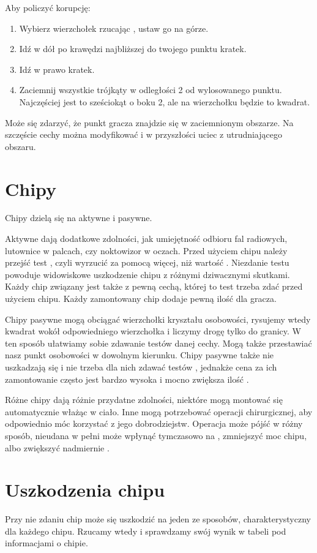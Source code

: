 Aby policzyć korupcję:
\begin{enumerate}
 \item Wybierz wierzchołek rzucając \dvi, ustaw go na górze.
 \item Idź w dół po krawędzi najbliższej do twojego punktu \dxx kratek.
 \item Idź w prawo \dxx[2] kratek.
 \item Zaciemnij wszystkie trójkąty w odległości 2 od wylosowanego punktu. Najczęściej jest to sześciokąt o boku 2, ale na wierzchołku będzie to kwadrat.
\end{enumerate}
Może się zdarzyć, że punkt gracza znajdzie się w zaciemnionym obszarze. 
Na szczęście cechy można modyfikować i w przyszłości uciec z utrudniającego obszaru.

\section{Chipy}
Chipy dzielą się na aktywne i pasywne.

Aktywne dają dodatkowe zdolności, jak umiejętność odbioru fal radiowych, lutownice w palcach, czy noktowizor w oczach.
Przed użyciem chipu należy przejść test \abnkp, czyli wyrzucić za pomocą \dxx więcej, niż wartość \abnkp. 
Niezdanie testu \abnkp powoduje widowiskowe uszkodzenie chipu z różnymi dziwacznymi skutkami.
Każdy chip związany jest także z pewną cechą, której to test trzeba zdać przed użyciem chipu.
Każdy zamontowany chip dodaje pewną ilość \abnkp dla gracza.

Chipy pasywne mogą obciągać wierzchołki kryształu osobowości, rysujemy wtedy kwadrat wokół odpowiedniego wierzchołka i liczymy drogę tylko do granicy.
W ten sposób ułatwiamy sobie zdawanie testów danej cechy.
Mogą także przestawiać nasz punkt osobowości w dowolnym kierunku.
Chipy pasywne także nie uszkadzają się i nie trzeba dla nich zdawać testów \abnkp, jednakże cena za ich zamontowanie często jest bardzo wysoka i mocno zwiększa ilość \abnkp.

Różne chipy dają różnie przydatne zdolności, niektóre mogą montować się automatycznie włażąc w ciało.
Inne mogą potrzebować operacji chirurgicznej, aby odpowiednio móc korzystać z jego dobrodziejstw.
Operacja może pójść w różny sposób, nieudana w pełni może wpłynąć tymczasowo na \abzyc, zmniejszyć moc chipu, albo zwiększyć nadmiernie \abnkp.

\section{Uszkodzenia chipu}
Przy nie zdaniu \abnkp chip może się uszkodzić na jeden ze sposobów, charakterystyczny dla każdego chipu.
Rzucamy wtedy \dxx i sprawdzamy swój wynik w tabeli pod informacjami o chipie.

